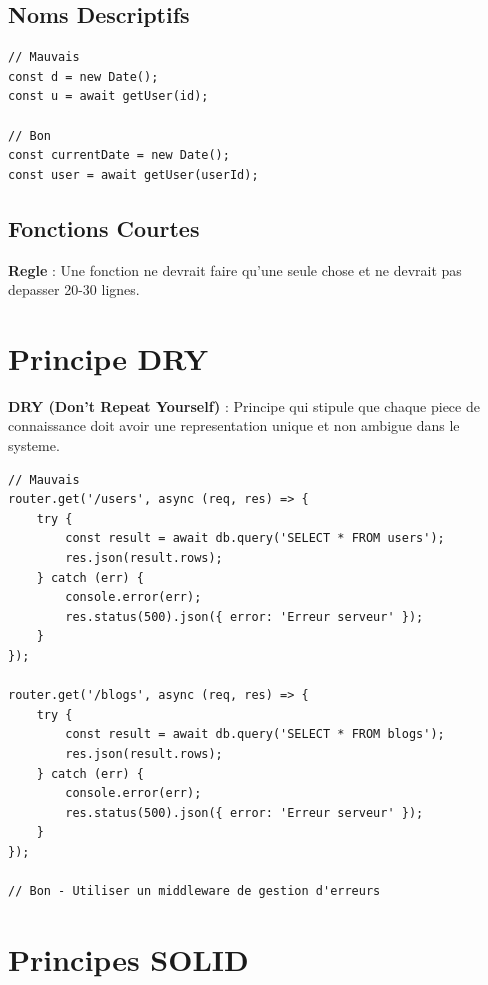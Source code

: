 \documentclass[a4paper,12pt]{book}
\begin{document}
\subsection{Noms Descriptifs}

\begin{lstlisting}[style=javascript, caption=Mauvais vs Bon nommage]
// Mauvais
const d = new Date();
const u = await getUser(id);

// Bon
const currentDate = new Date();
const user = await getUser(userId);
\end{lstlisting}

\subsection{Fonctions Courtes}

\begin{bestpracticebox}
    \textbf{Regle} : Une fonction ne devrait faire qu'une seule chose et ne devrait pas depasser 20-30 lignes.
\end{bestpracticebox}

\section{Principe DRY}

\begin{definitionbox}
    \textbf{DRY (Don't Repeat Yourself)} : Principe qui stipule que chaque piece de connaissance doit avoir une representation unique et non ambigue dans le systeme.
\end{definitionbox}

\begin{lstlisting}[style=javascript, caption=Eviter la repetition]
// Mauvais
router.get('/users', async (req, res) => {
    try {
        const result = await db.query('SELECT * FROM users');
        res.json(result.rows);
    } catch (err) {
        console.error(err);
        res.status(500).json({ error: 'Erreur serveur' });
    }
});

router.get('/blogs', async (req, res) => {
    try {
        const result = await db.query('SELECT * FROM blogs');
        res.json(result.rows);
    } catch (err) {
        console.error(err);
        res.status(500).json({ error: 'Erreur serveur' });
    }
});

// Bon - Utiliser un middleware de gestion d'erreurs
\end{lstlisting}

\section{Principes SOLID}
\end{document}
